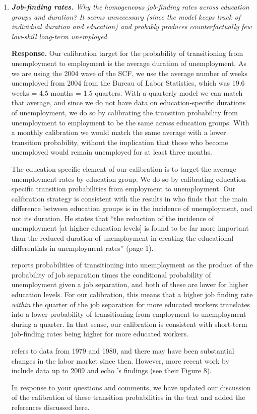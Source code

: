 \documentclass[12pt,letterpaper,english]{article}
\begin{document}
\begin{enumerate}
\begin{enumerate}
		\item \textit{\textbf{Job-finding rates.} Why the homogeneous job-finding rates across education groups and duration? It seems unnecessary (since the model keeps track of individual duration and education) and probably produces counterfactually few low-skill long-term unemployed.}
		
		\noindent \textbf{Response.} Our calibration target for the probability of transitioning from unemployment to employment is the average duration of unemployment. As we are using the 2004 wave of the SCF, we use the average number of weeks unemployed from 2004 from the Bureau of Labor Statistics, which was 19.6 weeks = 4.5 months = 1.5 quarters. With a quarterly model we can match that average, and since we do not have data on education-specific durations of unemployment, we do so by calibrating the transition probability from unemployment to employment to be the same across education groups. With a monthly calibration we would match the same average with a lower transition probability, without the implication that those who become unemployed would remain unemployed for at least three months. 
		
		The education-specific element of our calibration is to target the average unemployment rates by education group. We do so by calibrating education-specific transition probabilities from employment to unemployment. Our calibration strategy is consistent with the results in \citet{mincer1991education} who finds that the main difference between education groups is in the incidence of unemployment, and not its duration. He states that ``the reduction of the incidence of unemployment [at higher education levels] is found to be far more important than the reduced duration of unemployment in creating the educational differentials in unemployment rates'' (page 1). 
		
		\citeauthor{mincer1991education} reports probabilities of transitioning into unemployment as the product of the probability of job separation times the conditional probability of unemployment given a job separation, and both of these are lower for higher education levels. For our calibration, this means that a higher job finding rate \textit{within} the quarter of the job separation for more educated workers translates into a lower probability of transitioning from employment to unemployment during a quarter. In that sense, our calibration is consistent with short-term job-finding rates being higher for more educated workers. 
		
		\citet{mincer1991education} refers to data from 1979 and 1980, and there may have been substantial changes in the labor market since then. However, more recent work by \citet{elsby2010labor} include data up to 2009 and echo \citeauthor{mincer1991education}'s findings (see their Figure 8). 
		
		In response to your questions and comments, we have updated our discussion of the calibration of these transition probabilities in the text and added the references discussed here. 
		
	\end{enumerate}
\end{enumerate}
\end{document}
